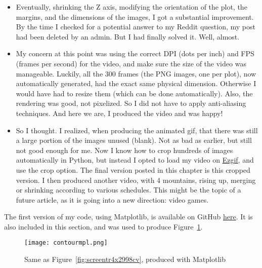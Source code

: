 \documentclass[oneside,10pt]{book}
\begin{document}
\begin{itemize}
\item Eventually, shrinking the Z axis, modifying the orientation of the plot, the margins, and the dimensions of the images, I got a substantial improvement. By the time I checked for a potential answer to my Reddit question, my post had been deleted by an admin. But I had finally solved it. Well, almost.

\item My concern at this point was using the correct DPI (dots per inch) and FPS (frames per second) for the video, and make sure the size of the video was manageable. Luckily, all the 300 frames (the PNG images, one per plot), now automatically generated, had the exact same physical dimension. Otherwise I would have had to resize them (which can be done automatically). Also, the rendering was good, not pixelized. So I did not have to apply anti-aliasing techniques. And here we are, I produced the video and was happy!

\item So I thought. I realized, when producing the animated gif, that there was still a large portion of the images unused (blank). Not as bad as earlier, but still not good enough for me. Now I know how to crop hundreds of images automatically in Python, but instead I opted to load my video on \href{https://ezgif.com/crop-video}{Ezgif}, and use the crop option. The final version posted in this chapter is this cropped version. I then produced another video, with 4 mountains, rising up, merging or shrinking according to various schedules. This might be the topic of a future article, as it is going into a new direction: video games.
\end{itemize}\vspace{1ex}

\noindent 
The first version of my code, using \textcolor{index}{Matplotlib}, is available
 on GitHub \href{https://github.com/VincentGranville/Visualizations/blob/main/Source-Code/contourMatplotlib.py}{here}. It is also included in this section, and was used to produce Figure~\ref{fig:screentr4xmplcv}.

\begin{figure}[H]
\centering
\texttt{[image: contourmpl.png]}   
\caption{Same as Figure~\ref{fig:screentr4x2998cv}, produced with Matplotlib}
\label{fig:screentr4xmplcv}
\end{figure}
\end{document}
